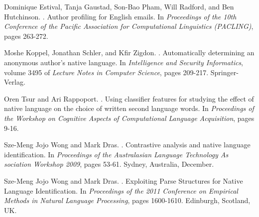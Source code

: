 \documentclass[11pt]{article}
\begin{document}
\begin{thebibliography}{}

Dominique Estival, Tanja Gaustad, Son-Bao Pham, Will Radford, and Ben Hutchinson.
.
\newblock Author profiling for English emails. In {\em Proceedings of the 10th Conference of the Pacific Association for Computational Linguistics (PACLING)}, pages 263-272.

Moshe Koppel, Jonathan Schler, and Kfir Zigdon.
.
\newblock Automatically determining an anonymous author’s native language. In {\em Intelligence and Security Informatics}, volume 3495 of {\em Lecture Notes in Computer Science}, pages 209-217.
\newblock Springer-Verlag.

Oren Tsur and Ari Rappoport.
.
\newblock Using classifier features for studying the effect of native language on the choice of written second language words. In {\em Proceedings of the Workshop on Cognitive Aspects of Computational Language Acquisition}, pages 9-16.

Sze-Meng Jojo Wong and Mark Dras.
.
\newblock Contrastive analysis and native language identification. In {\em Proceedings of the Australasian Language Technology As sociation Workshop 2009}, pages 53-61.
\newblock Sydney, Australia, December.

Sze-Meng Jojo Wong and Mark Dras.
.
\newblock Exploiting Parse Structures for Native Language Identification. In {\em Proceedings of the 2011 Conference on Empirical Methods in Natural Language Processing}, pages 1600-1610.
\newblock Edinburgh, Scotland, UK.

\end{thebibliography}
\end{document}

